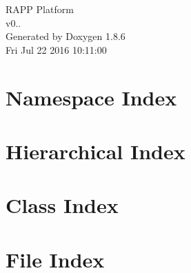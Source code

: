 \documentclass[twoside]{book}
\newcommand{\clearemptydoublepage}{%
  \newpage{\pagestyle{empty}\cleardoublepage}%
}
\begin{document}
\hypersetup{pageanchor=false}
\begin{titlepage}
\vspace*{7cm}
\begin{center}%
{\Large R\-A\-P\-P Platform \\[1ex]\large v0.. }\\
\vspace*{1cm}
{\large Generated by Doxygen 1.8.6}\\
\vspace*{0.5cm}
{\small Fri Jul 22 2016 10:11:00}\\
\end{center}
\end{titlepage}
\clearemptydoublepage
\tableofcontents
\clearemptydoublepage
{}
\hypersetup{pageanchor=true}

\chapter{Namespace Index}

\chapter{Hierarchical Index}

\chapter{Class Index}

\chapter{File Index}

\end{document}
